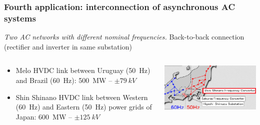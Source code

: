 \begin{frame}
\begin{columns}
\begin{column}{0.5\linewidth}
\begin{center}
\end{center}
\end{column}
\end{columns}
\end{frame}



\begin{frame}
\frametitle{Fourth application: interconnection of asynchronous AC systems}
\textit{Two AC networks with different nominal frequencies.}
Back-to-back connection (rectifier and inverter in same substation)
\begin{columns}
\begin{column}{0.5\linewidth}
\begin{itemize}
    \item Melo HVDC link between Uruguay (\SI{50}{Hz}) and Brazil (\SI{60}{Hz}): \SI{500}{MW} -- $\pm \SI{79}{kV}$
    \item Shin Shinano HVDC link between Western (\SI{60}{Hz}) and Eastern (\SI{50}{Hz}) power grids of Japan: \SI{600}{MW} -- $\pm \SI{125}{kV}$
\end{itemize}
\end{column}
\begin{column}{0.5\linewidth}
\begin{center}
    \includegraphics[width=0.8\linewidth]{images/japan.png}
\end{center}
\end{column}
\end{columns}
\end{frame}

